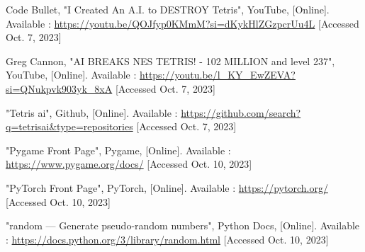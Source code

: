\documentclass[conference]{IEEEtran}
\begin{document}
\begin{thebibliography}{00}
 Code Bullet, "I Created An A.I. to DESTROY Tetris", YouTube, [Online]. Available : \url{https://youtu.be/QOJfyp0KMmM?si=dKykHlZGzpcrUu4L} [Accessed Oct. 7, 2023]

 Greg Cannon, "AI BREAKS NES TETRIS! - 102 MILLION and level 237", YouTube, [Online]. Available : \url{https://youtu.be/l_KY_EwZEVA?si=QNukpvk903yk_8xA} [Accessed Oct. 7, 2023]

 "Tetris ai", Github, [Online]. Available : \url{https://github.com/search?q=tetrisai&type=repositories} [Accessed Oct. 7, 2023]

 "Pygame Front Page", Pygame, [Online]. Available : \url{https://www.pygame.org/docs/} [Accessed Oct. 10, 2023]

 "PyTorch Front Page", PyTorch, [Online]. Available : \url{https://pytorch.org/} [Accessed Oct. 10, 2023]

 "random — Generate pseudo-random numbers", Python Docs, [Online]. Available : \url{https://docs.python.org/3/library/random.html} [Accessed Oct. 10, 2023]



\end{thebibliography}
\end{document}
